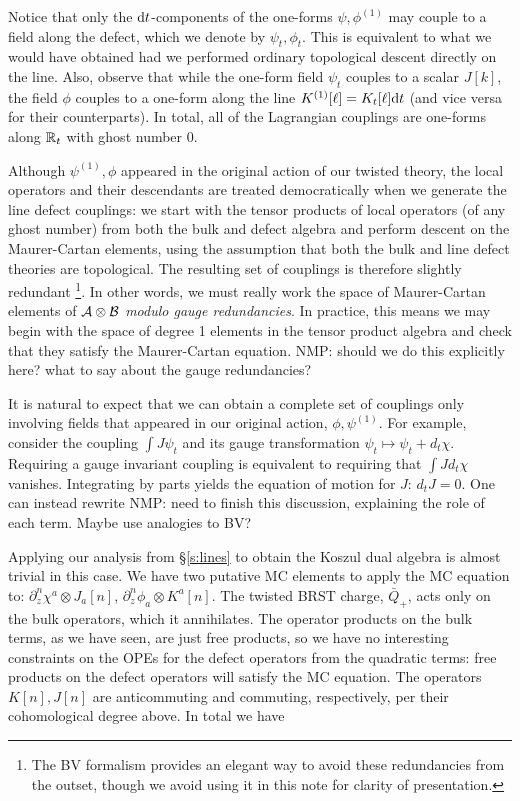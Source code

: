 \documentclass[11pt]{amsart}
\def\natalie#1{{\textcolor{green!65!black}{NMP: {#1}}}}
\begin{document}
Notice that only the ${\rm d} t$-components of the one-forms $\psi, \phi^{(1)}$ may couple to a field along the defect, which we denote by $\psi_t, \phi_t$. This is equivalent to what we would have obtained had we performed ordinary topological descent directly on the line.
Also, observe that while the one-form field $\psi_t$ couples to a scalar $J[k]$, the field $\phi$ couples to a one-form along the line $K^{(1)}[\ell] = K_t [\ell] {\rm d} t$ (and vice versa for their counterparts). 
In total, all of the Lagrangian couplings are one-forms along $\mathbb R_t$ with ghost number 0.

Although $\psi^{(1)}, \phi$ appeared in the original action of our twisted theory, the local operators and their descendants are treated democratically when we generate the line defect couplings: we start with the tensor products of local operators (of any ghost number) from both the bulk and defect algebra and perform descent on the Maurer-Cartan elements, using the assumption that both the bulk and line defect theories are topological. The resulting set of couplings is therefore slightly redundant \footnote{The BV formalism provides an elegant way to avoid these redundancies from the outset, though we avoid using it in this note for clarity of presentation.}. In other words, we must really work the space of Maurer-Cartan elements of $\mathcal A \otimes \mathcal B$ \textit{modulo gauge redundancies}. In practice, this means we may begin with the space of degree 1 elements in the tensor product algebra and check that they satisfy the Maurer-Cartan equation. \natalie{should we do this explicitly here? what to say about the gauge redundancies?}

It is natural to expect that we can obtain a complete set of couplings only involving fields that appeared in our original action, $\phi, \psi^{(1)}$. For example, consider the coupling $\int J \psi_t$ and its gauge transformation $\psi_t \mapsto \psi_t + d_t \chi$. Requiring a gauge invariant coupling is equivalent to requiring that $\int J d_t \chi$ vanishes. Integrating by parts yields the equation of motion for $J$: $d_t J = 0$. One can instead rewrite \natalie{need to finish this discussion, explaining the role of each term. Maybe use analogies to BV?}

Applying our analysis from \S \ref{s:lines} to obtain the Koszul dual algebra is almost trivial in this case. We have two putative MC elements to apply the MC equation to:  $\partial_z^n \chi^a \otimes J_a[n]$,  $\partial_z^n \phi_a \otimes K^a[n]$. The twisted BRST charge, $\bar{Q}_+$, acts only on the bulk operators, which it annihilates. The operator products on the bulk terms, as we have seen, are just free products, so we have no interesting constraints on the OPEs for the defect operators from the quadratic terms: free products on the defect operators will satisfy the MC equation. The operators $K[n], J[n]$ are anticommuting and commuting, respectively, per their cohomological degree above. In total we have
\end{document}
